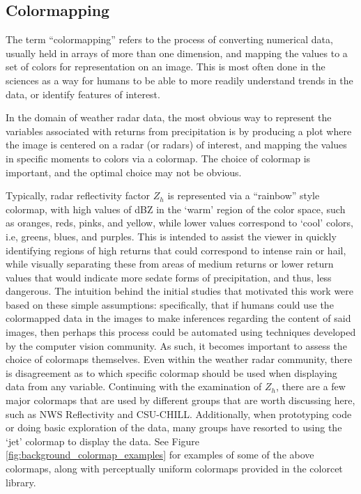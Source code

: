 \subsection{Colormapping}
\label{ssec:background_colormap}

The term “colormapping” refers to the process of converting numerical data, usually held in arrays of more than one dimension, and mapping the values to a set of colors for representation on an image. 
This is most often done in the sciences as a way for humans to be able to more readily understand trends in the data, or identify features of interest. 

In the domain of weather radar data, the most obvious way to represent the variables associated with returns from precipitation is by producing a plot where the image is centered on a radar (or radars) of interest, and mapping the values in specific moments to colors via a colormap. 
The choice of colormap is important, and the optimal choice may not be obvious.

Typically, radar reflectivity factor ${Z_h}$ is represented via a “rainbow” style colormap, with high values of dBZ in the ‘warm’ region of the color space, such as oranges, reds, pinks, and yellow, while lower values correspond to ‘cool’ colors, i.e, greens, blues, and purples. 
This is intended to assist the viewer in quickly identifying regions of high returns that could correspond to intense rain or hail, while visually separating these from areas of medium returns or lower return values that would indicate more sedate forms of precipitation, and thus, less dangerous. 
The intuition behind the initial studies that motivated this work were based on these simple assumptions: specifically, that if humans could use the colormapped data in the images to make inferences regarding the content of said images, then perhaps this process could be automated using techniques developed by the computer vision community.
As such, it becomes important to assess the choice of colormaps themselves. 
Even within the weather radar community, there is disagreement as to which specific colormap should be used when displaying data from any variable. 
Continuing with the examination of ${Z_h}$, there are a few major colormaps that are used by different groups that are worth discussing here, such as NWS Reflectivity and CSU-CHILL. 
Additionally, when prototyping code or doing basic exploration of the data, many groups have resorted to using the ‘jet’ colormap to display the data.
See Figure \ref{fig:background_colormap_examples} for examples of some of the above colormaps, along with perceptually uniform colormaps provided in the colorcet library.

